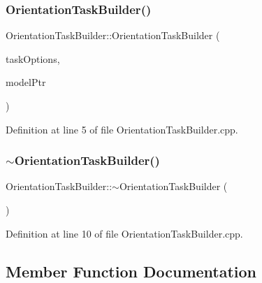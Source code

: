 \subsubsection{\texorpdfstring{Orientation\+Task\+Builder()}{OrientationTaskBuilder()}}
{\footnotesize\ttfamily Orientation\+Task\+Builder\+::\+Orientation\+Task\+Builder (\begin{DoxyParamCaption}\item[{const \hyperlink{classocra_1_1TaskBuilderOptions}{Task\+Builder\+Options} \&}]{task\+Options,  }\item[{Model\+::\+Ptr}]{model\+Ptr }\end{DoxyParamCaption})}



Definition at line 5 of file Orientation\+Task\+Builder.\+cpp.

\hypertarget{classocra_1_1OrientationTaskBuilder_a15053032636ee9416465134314a18226}{}\label{classocra_1_1OrientationTaskBuilder_a15053032636ee9416465134314a18226} 
\subsubsection{\texorpdfstring{$\sim$\+Orientation\+Task\+Builder()}{~OrientationTaskBuilder()}}
{\footnotesize\ttfamily Orientation\+Task\+Builder\+::$\sim$\+Orientation\+Task\+Builder (\begin{DoxyParamCaption}{ }\end{DoxyParamCaption})\hspace{0.3cm}{\ttfamily [virtual]}}



Definition at line 10 of file Orientation\+Task\+Builder.\+cpp.



\subsection{Member Function Documentation}
\hypertarget{classocra_1_1OrientationTaskBuilder_a38d5badfcdbcdbc745f305e38af8b737}{}\label{classocra_1_1OrientationTaskBuilder_a38d5badfcdbcdbc745f305e38af8b737} 
